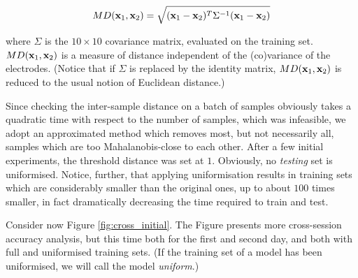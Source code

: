$$ MD(\mathbf{x}_1,\mathbf{x}_2) = \sqrt{(\mathbf{x}_1-\mathbf{x}_2)^T \Sigma^{-1} (\mathbf{x}_1-\mathbf{x}_2)} $$

\noindent where $\Sigma$ is the $10\times10$ covariance matrix, evaluated
on the training set. $MD(\mathbf{x}_1,\mathbf{x}_2)$ is a measure of distance
independent of the (co)variance of the electrodes. (Notice that if
$\Sigma$ is replaced by the identity matrix, $MD(\mathbf{x}_1,\mathbf{x}_2)$ is
reduced to the usual notion of Euclidean distance.)

Since checking the inter-sample distance on a batch of samples
obviously takes a quadratic time with respect to the number of
samples, which was infeasible, we adopt an approximated method which
removes most, but not necessarily all, samples which are too
Mahalanobis-close to each other. After a few initial experiments, the
threshold distance was set at $1$. Obviously, no \emph{testing} set is
uniformised. Notice, further, that applying uniformisation results in
training sets which are considerably smaller than the original ones,
up to about $100$ times smaller, in fact dramatically decreasing the
time required to train and test.

Consider now Figure \ref{fig:cross_initial}. The Figure presents more
cross-session accuracy analysis, but this time both for the first and
second day, and both with full and uniformised training sets. (If the
training set of a model has been uniformised, we will call the model
\emph{uniform}.)

